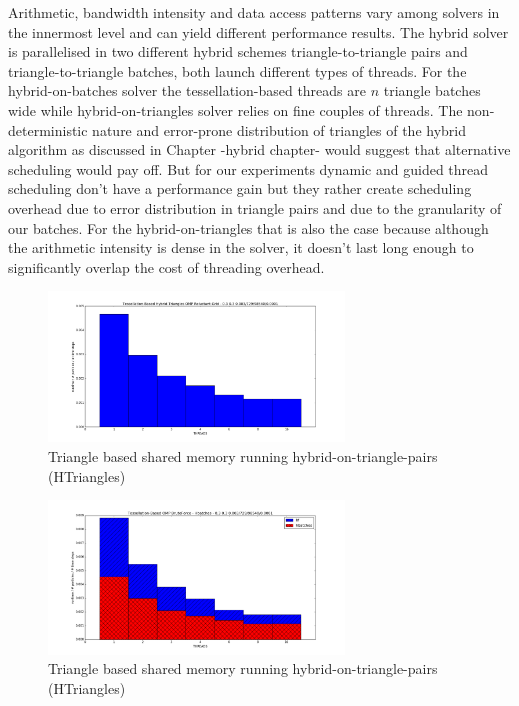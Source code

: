 \documentclass[times,12pt]{article}
\begin{document}
Arithmetic, bandwidth intensity and data access patterns vary among solvers in the innermost level and can yield different performance results. The hybrid solver is parallelised in two different hybrid schemes triangle-to-triangle pairs and triangle-to-triangle batches, both launch different types of threads. For the hybrid-on-batches solver the tessellation-based threads
are $n$ triangle batches wide while hybrid-on-triangles solver relies on fine couples of threads. The non-deterministic nature and error-prone distribution of triangles of the hybrid algorithm as discussed in Chapter {-hybrid chapter-} would suggest that alternative scheduling would pay off. But for our experiments dynamic and guided thread scheduling don't have a performance gain but they rather create scheduling overhead due to error distribution in triangle pairs and due to the granularity of our batches. For the hybrid-on-triangles that is also the case because although the arithmetic intensity is dense in the solver, it doesn't last long enough to significantly overlap the cost of threading overhead. 

\begin{figure}[htb]
  \begin{center}
    \includegraphics[width=0.7\textwidth]{experiments/omp/htriangle_omp_triangles_200.png}
  \end{center}
  \caption{Triangle based shared memory running hybrid-on-triangle-pairs (HTriangles)}
  \label{figure:htriangles_triangles_triangle_omp}
\end{figure}


\begin{figure}[htb]
  \begin{center}
    \includegraphics[width=0.7\textwidth]{experiments/omp/bf_vs_hbatches_omp_200.png}
  \end{center}
  \caption{Triangle based shared memory running hybrid-on-triangle-pairs (HTriangles)}
  \label{figure:bfvshbatches_triangle_omp}
\end{figure}
\end{document}
